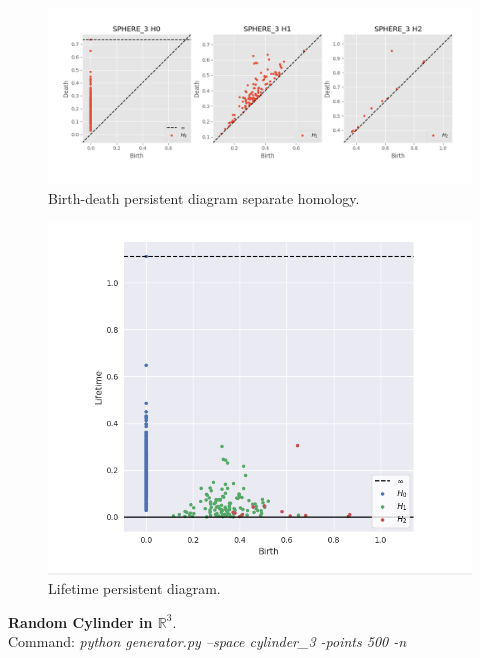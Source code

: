 \documentclass[11pt,a4paper]{report}
\begin{document}
              \begin{figure}[H]
                \centering
                \includegraphics[width=\linewidth]{./ripser/rand_sphere_homology_seperate.PNG}
                \caption{Birth-death persistent diagram separate homology.}
                \label{fig:sep hom}
              \end{figure}

              \begin{figure}[H]
                \centering
                \includegraphics[width=0.5\linewidth, scale=0.5]{./ripser/rand_sphere_lifetime.PNG}
                \caption{Lifetime persistent diagram.}
                \label{fig:sep hom}
              \end{figure}

              \textbf{Random Cylinder in $\mathbb{R}^3$}.\\
              Command: \textit{python generator.py --space cylinder\_3 -points 500 -n}
\end{document}
